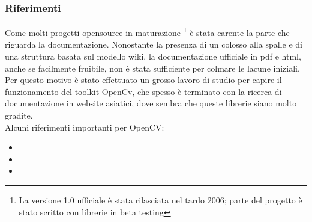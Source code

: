 



\subsubsection{Riferimenti}

Come molti progetti opensource in maturazione \footnote{La versione 1.0 ufficiale è stata rilasciata nel tardo 2006; parte del progetto è stato scritto con librerie in beta testing} è stata carente la parte che riguarda la documentazione. Nonostante la presenza di un colosso alla spalle e di una struttura basata sul modello wiki, la documentazione ufficiale in pdf e html, anche se facilmente fruibile, non è stata sufficiente per colmare le lacune iniziali. Per questo motivo è stato effettuato un grosso lavoro di studio per capire il funzionamento del toolkit OpenCv, che spesso è terminato con la ricerca di documentazione in website asiatici, dove sembra che queste librerie siano molto gradite.\\
Alcuni riferimenti importanti per OpenCV:
\begin{itemize}
 \item {}
\item {}
\item {}
\end{itemize}

 
